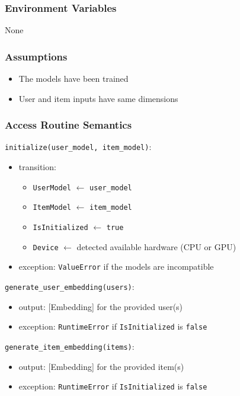 \documentclass[12pt, titlepage]{article}
\begin{document}
\subsubsection{Environment Variables}

None

\subsubsection{Assumptions}

\begin{itemize}
  \item The models have been trained
  \item User and item inputs have same dimensions
\end{itemize}
\subsubsection{Access Routine Semantics}

\noindent \texttt{initialize(user\_model, item\_model)}:
\begin{itemize}
\item transition:
  \begin{itemize}
    \item \texttt{UserModel} $\leftarrow$ \texttt{user\_model}
    \item \texttt{ItemModel} $\leftarrow$ \texttt{item\_model}
    \item \texttt{IsInitialized} $\leftarrow$ \texttt{true}
    \item \texttt{Device} $\leftarrow$ detected available hardware (CPU or GPU)
  \end{itemize}
\item exception: \texttt{ValueError} if the models are incompatible
\end{itemize}

\noindent \texttt{generate\_user\_embedding(users)}:
\begin{itemize}
\item output: [Embedding] for the provided user(s)
\item exception: \texttt{RuntimeError} if \texttt{IsInitialized} is \texttt{false}
\end{itemize}

\noindent \texttt{generate\_item\_embedding(items)}:
\begin{itemize}
\item output: [Embedding] for the provided item(s)
\item exception: \texttt{RuntimeError} if \texttt{IsInitialized} is \texttt{false}
\end{itemize}
\end{document}
